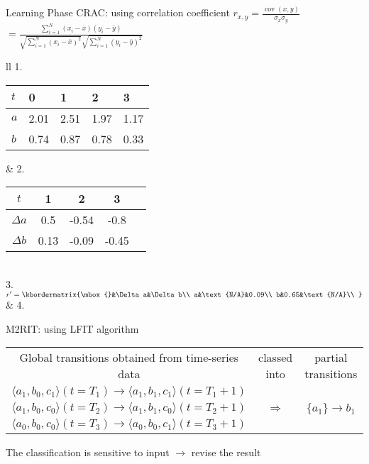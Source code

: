 \documentclass[8pt]{beamer}
\begin{document}
\begin{frame}{Learning Phase}
CRAC: using correlation coefficient $r_{x,y}={\frac {\operatorname {cov} (x,y)}{\sigma _{x}\sigma _{y}}}$\pause$={\frac {\sum _{i=1}^{N}(x_{i}-{\bar {x}})(y_{i}-{\bar {y}})}{{\sqrt {\sum _{i=1}^{N}(x_{i}-{\bar {x}})^{2}}}{\sqrt {\sum _{i=1}^{N}(y_{i}-{\bar {y}})^{2}}}}}$

\pause
\vspace{0.2cm}
\begin{tabular}{ll}
1.\begin{tabular}{l|*{4}{l}}
$t$&0&1&2&3\\
\hline
$a$&2.01&2.51&1.97&1.17\\
$b$&0.74&0.87&0.78&0.33\\
\end{tabular}   
\pause
& 
2.
\begin{tabular}{c|c*{3}{S}}
$t$&1&2&3\\
\hline
$\Delta a$&0.5&-0.54&-0.8\\
$\Delta b$&0.13&-0.09&-0.45\\
\end{tabular}
\pause
\\
3.
$r'=\kbordermatrix{\mbox{}&\Delta a&\Delta b\\
a&\text{N/A}&0.09\\
b&0.65&\text{N/A}\\
}$ 
\pause
&
4.
\end{tabular}

\vspace{1.2cm}
\pause

M2RIT: using LFIT algorithm

\vspace{0.2cm}
\begin{tabular}{ccc}
    Global transitions obtained from time-series data & classed into & partial transitions\\
    $\langle a_1,b_0,c_1\rangle(t=T_1)\to \langle a_1,b_1,c_1\rangle(t=T_1+1)$&&\\
    $\langle a_1,b_0,c_0\rangle(t=T_2)\to \langle a_1,b_1,c_0\rangle(t=T_2+1)$&$\Longrightarrow$&$\{a_1\}\to b_1$\\
    $\langle a_0,b_0,c_0\rangle(t=T_3)\to \langle a_0,b_0,c_1\rangle(t=T_3+1)$&&
\end{tabular}

\vspace{0.2cm}
\pause
The classification is sensitive to input $\to$ revise the result
\end{frame}
\end{document}
